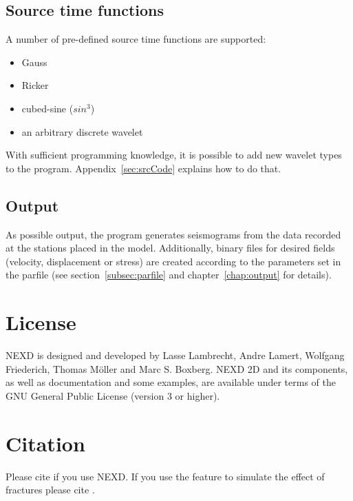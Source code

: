     \subsection{Source time functions}  
    A number of pre-defined source time functions are supported:
    \begin{itemize}
        \item Gauss
        \item Ricker
        \item cubed-sine ($sin^3$)
        \item an arbitrary discrete wavelet
    \end{itemize}       
    With sufficient programming knowledge, it is possible to add new wavelet types to the program. Appendix~\ref{sec:srcCode} explains how to do that.   
      
    \subsection{Output}
    As possible output, the program generates seismograms from the data recorded at the stations placed in the model. Additionally, binary files for desired fields (velocity, displacement or stress) are created according to the parameters set in the parfile (see section~\ref{subsec:parfile} and chapter~\ref{chap:output} for details).
			     
\section{License}
NEXD is designed and developed by Lasse Lambrecht, Andre Lamert, Wolfgang Friederich, Thomas M{\"o}ller and Marc S. Boxberg. NEXD 2D and its components, as well as documentation and some examples, are available under terms of the GNU General Public License (version 3 or higher).

\section{Citation}
Please cite \cite{Lambrecht.2017} if you use NEXD. If you use the feature to simulate the effect of fractures please cite \cite{moeller.2018}.